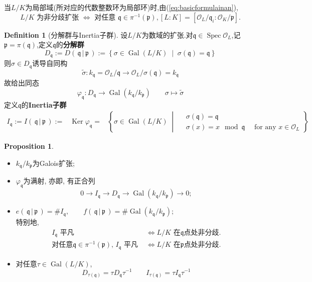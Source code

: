 \documentclass[12pt,A4paper,oneside,reqno]{amsart}
\numberwithin{equation}{section}
\theoremstyle{definition}
\newtheorem{proposition}[theorem]{Proposition}
\newtheorem{defn}[theorem]{Definition}
\theoremstyle{plain}
\theoremstyle{plain}
\numberwithin{equation}{section}
\theoremstyle{remark}
\DeclareMathOperator{\Ker}{\operatorname{Ker}}
\newcommand{\Spec}{\operatorname{Spec}}
\newcommand{\Gal}{\operatorname{Gal}}
\begin{document}
当$L/K$为局部域(所对应的代数整数环为局部环)时,由(\ref{eq:basicformulainan}),
$$L/K \text{ 为非分歧扩张 } \Longleftrightarrow \text{ 对任意 }\mathfrak{q} \in \pi^{-1}(\mathfrak{p}), [L:K]=[\mathcal{O}_L/\mathfrak{q}_i:\mathcal{O}_K/\mathfrak{p}].$$
\begin{defn}[分解群与Inertia子群]
	设$L/K$为数域的扩张.对$\mathfrak{q} \in \Spec \mathcal{O}_L$,记$\mathfrak{p}=\pi(\mathfrak{q})$,定义$\mathfrak{q}$的\textbf{分解群}
	$$D_{\mathfrak{q}}:=D(\,\mathfrak{q}\,|\,\mathfrak{p}\,):=\left\{\sigma \in \Gal(L/K) \;\middle|\; \sigma(\mathfrak{q})=\mathfrak{q} \right\}$$
	则$\sigma \in D_{\mathfrak{q}}$诱导自同构
	$$\tilde{\sigma}: k_{\mathfrak{q}} = \mathcal{O}_L/{\mathfrak{q}} \longrightarrow \mathcal{O}_L/\sigma(\mathfrak{q})=k_{\mathfrak{q}}$$
	故给出同态
	$$\varphi_{\mathfrak{q}}:D_{\mathfrak{q}} \longrightarrow \Gal(k_{\mathfrak{q}}/k_{\mathfrak{p}}) \qquad \sigma \longmapsto \tilde{\sigma}$$
	定义$\mathfrak{q}$的\textbf{Inertia子群}
	\begin{equation*}
	\begin{aligned}
		I_{\mathfrak{q}}:=I(\,\mathfrak{q}\,|\,\mathfrak{p}\,):=& \Ker \varphi_{\mathfrak{q}}
		=&\left\{\sigma \in \Gal(L/K) \;\middle|\; \begin{aligned}
		&\sigma(\mathfrak{q})=\mathfrak{q}\\
		&\sigma(x)=x \mod \mathfrak{q} \quad\text{ for any }x \in \mathcal{O}_L
		\end{aligned} \right\}
	\end{aligned}
	\end{equation*}
\end{defn}
\begin{proposition}\label{prop:Inertia}\
	\begin{itemize}
		\item $k_{\mathfrak{q}}/k_{\mathfrak{p}}$为Galois扩张;
		\item $\varphi_{\mathfrak{q}}$为满射, 亦即, 有正合列
		$$0 \longrightarrow I_{\mathfrak{q}} \longrightarrow D_{\mathfrak{q}} \longrightarrow \Gal(k_{\mathfrak{q}}/k_{\mathfrak{p}}) \longrightarrow 0;$$
		\item $e(\,\mathfrak{q}\,|\,\mathfrak{p}\,)=\#I_{\mathfrak{q}}, \qquad f(\,\mathfrak{q}\,|\,\mathfrak{p}\,)=\# \Gal(k_{\mathfrak{q}}/k_{\mathfrak{p}});$\\
		特别地,
		\begin{equation*}
		\begin{aligned}
		I_{\mathfrak{q}}\text{ 平凡 }& \Longleftrightarrow L/K \text{ 在$\mathfrak{q}$点处非分歧.}\\
		\text{对任意$\mathfrak{q} \in \pi^{-1}(\mathfrak{p})$, } I_{\mathfrak{q}}\text{ 平凡 }& \Longleftrightarrow L/K \text{ 在$\mathfrak{p}$点处非分歧.}
		\end{aligned}
		\end{equation*}
		\item 对任意$\tau \in \Gal(L/K)$,
		$$D_{\tau(\mathfrak{q})}=\tau D_{\mathfrak{q}}\tau^{-1} \qquad I_{\tau(\mathfrak{q})}=\tau I_{\mathfrak{q}}\tau^{-1}$$
	\end{itemize}
\end{proposition}
		
\end{document}
